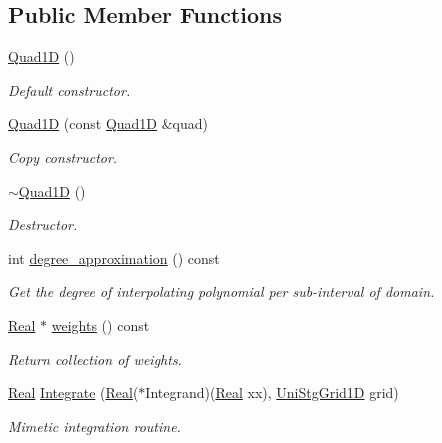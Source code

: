 \subsection*{Public Member Functions}
\begin{DoxyCompactItemize}
\item 
\hyperlink{classmtk_1_1Quad1D_ada5a2f1e7c92dbf1f85c61ecd0d173ec}{Quad1\+D} ()
\begin{DoxyCompactList}\small\item\em Default constructor. \end{DoxyCompactList}\item 
\hyperlink{classmtk_1_1Quad1D_ac4334daf0614bd4c789600c885b6116d}{Quad1\+D} (const \hyperlink{classmtk_1_1Quad1D}{Quad1\+D} \&quad)
\begin{DoxyCompactList}\small\item\em Copy constructor. \end{DoxyCompactList}\item 
\hyperlink{classmtk_1_1Quad1D_ae3de223d0841c9602feb4ea8b305a373}{$\sim$\+Quad1\+D} ()
\begin{DoxyCompactList}\small\item\em Destructor. \end{DoxyCompactList}\item 
int \hyperlink{classmtk_1_1Quad1D_aa1d1fe5f7cdaf8bf923a11c7d3d2468f}{degree\+\_\+approximation} () const 
\begin{DoxyCompactList}\small\item\em Get the degree of interpolating polynomial per sub-\/interval of domain. \end{DoxyCompactList}\item 
\hyperlink{group__c01-roots_gac080bbbf5cbb5502c9f00405f894857d}{Real} $\ast$ \hyperlink{classmtk_1_1Quad1D_aefd1ca6b381e1428b3d163ed650f79c4}{weights} () const 
\begin{DoxyCompactList}\small\item\em Return collection of weights. \end{DoxyCompactList}\item 
\hyperlink{group__c01-roots_gac080bbbf5cbb5502c9f00405f894857d}{Real} \hyperlink{classmtk_1_1Quad1D_a89b5340ed484e5d36a569b1d17300cc8}{Integrate} (\hyperlink{group__c01-roots_gac080bbbf5cbb5502c9f00405f894857d}{Real}($\ast$Integrand)(\hyperlink{group__c01-roots_gac080bbbf5cbb5502c9f00405f894857d}{Real} xx), \hyperlink{classmtk_1_1UniStgGrid1D}{Uni\+Stg\+Grid1\+D} grid)
\begin{DoxyCompactList}\small\item\em Mimetic integration routine. \end{DoxyCompactList}\end{DoxyCompactItemize}

